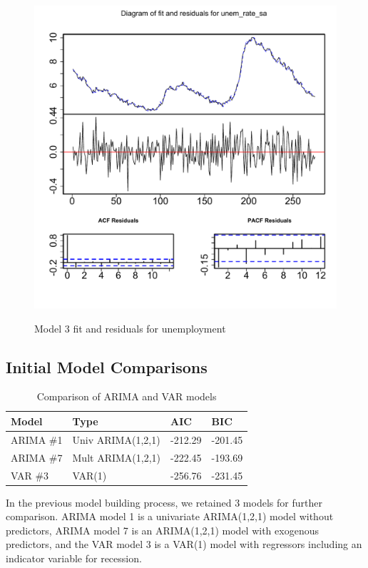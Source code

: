 \documentclass[twoside,twocolumn]{article}
\begin{document}
   \begin{figure}[htb]
    	\centering
     	\caption{Model 3 fit and residuals for unemployment}
     	\includegraphics[width=\linewidth]{images/varfitmodel3}
     	\label{fig:varfitmodel3}
 \end{figure}

\subsection{Initial Model Comparisons}

\begin{table}[H]
\centering
\caption{Comparison of ARIMA and VAR models}
\begin{tabular}{llll}
  \hline
Model & Type & AIC & BIC \\
  \hline
ARIMA \#1 &Univ ARIMA(1,2,1) &   -212.29 & -201.45  \\
ARIMA \#7 & Mult ARIMA(1,2,1)  & -222.45 & -193.69   \\
VAR \#3 & VAR(1) & -256.76 & -231.45 \\
   \hline
\end{tabular}
\end{table}


In the previous model building process, we retained 3 models for further comparison. ARIMA model 1 is a univariate ARIMA(1,2,1) model without predictors, ARIMA model 7 is an ARIMA(1,2,1) model with exogenous predictors, and the VAR model 3 is a VAR(1) model with regressors including an indicator variable for recession.
\end{document}
